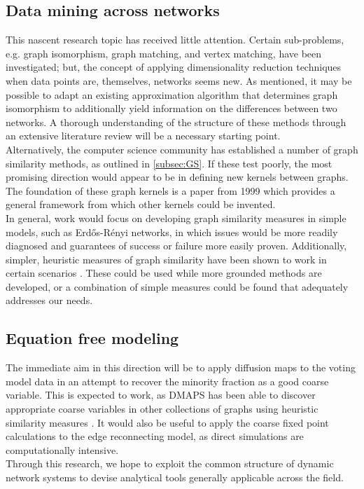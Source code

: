 \documentclass[11pt]{article}
\begin{document}
\subsection{Data mining across networks}
\indent This nascent research topic has received little attention. Certain sub-problems, e.g. graph isomorphism, graph matching, and vertex matching, have been investigated; but, the concept of applying dimensionality reduction techniques when data points are, themselves, networks seems new. As mentioned, it may be possible to adapt an existing approximation algorithm that determines graph isomorphism to additionally yield information on the differences between two networks. A thorough understanding of the structure of these methods through an extensive literature review will be a necessary starting point. \vspace{1mm}\\
\indent Alternatively, the computer science community has established a number of graph similarity methods, as outlined in \ref{subsec:GS}. If these test poorly, the most promising direction would appear to be in defining new kernels between graphs. The foundation of these graph kernels is a paper from 1999 \cite{Haussler1999} which provides a general framework from which other kernels could be invented. \vspace{1mm}\\
\indent In general, work would focus on developing graph similarity measures in simple models, such as Erd\H{o}s-R\'{e}nyi networks, in which issues would be more readily diagnosed and guarantees of success or failure more easily proven. Additionally, simpler, heuristic measures of graph similarity have been shown to work in certain scenarios \cite{Rajendran2013}. These could be used while more grounded methods are developed, or a combination of simple measures could be found that adequately addresses our needs.
\subsection{Equation free modeling}
\indent The immediate aim in this direction will be to apply diffusion maps to the voting model data in an attempt to recover the minority fraction as a good coarse variable. This is expected to work, as DMAPS has been able to discover appropriate coarse variables in other collections of graphs using heuristic similarity measures \cite{Rajendran2013}. It would also be useful to apply the coarse fixed point calculations to the edge reconnecting model, as direct simulations are computationally intensive. \vspace{1mm} \\

Through this research, we hope to exploit the common structure of dynamic network systems to devise analytical tools generally applicable across the field.



\end{document}
